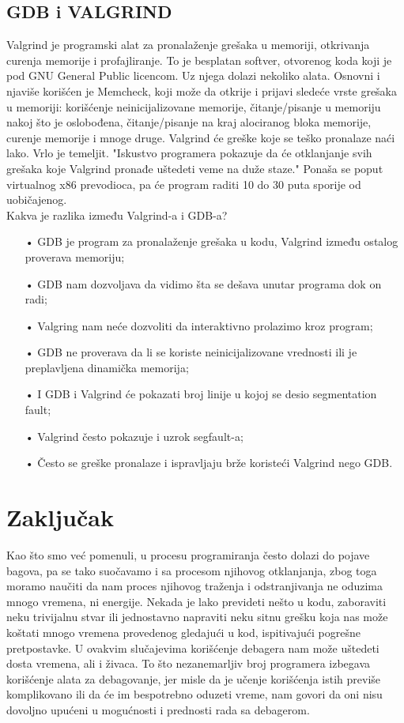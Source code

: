 \documentclass[a4paper]{article}
\begin{document}
\subsection{GDB i VALGRIND}
\label{subsec:valgrind}
Valgrind je programski alat za pronalaženje grešaka u memoriji, otkrivanja curenja memorije i 
profajliranje. To je besplatan softver, otvorenog koda koji je pod GNU General Public licencom. 
Uz njega dolazi nekoliko alata. Osnovni i njaviše korišćen je Memcheck, koji može da otkrije i  
prijavi sledeće vrste grešaka u memoriji: korišćenje neinicijalizovane memorije, čitanje/pisanje u 
memoriju nakoj što je oslobođena, čitanje/pisanje na kraj alociranog bloka memorije, 
curenje memorije i  mnoge druge. Valgrind će greške koje se teško pronalaze naći lako. Vrlo je 
temeljit. "Iskustvo programera pokazuje da će otklanjanje svih grešaka koje Valgrind pronađe 
uštedeti veme na duže staze." Ponaša se poput virtualnog x86 prevodioca, pa će program raditi 10 
do 30 puta sporije od uobičajenog. \\

Kakva je razlika između Valgrind-a i GDB-a?
\begin{enumerate}
\item[•]GDB je program za pronalaženje grešaka u kodu, Valgrind između ostalog proverava memoriju;
\item[•]GDB nam dozvoljava da vidimo šta se dešava unutar programa dok on radi;
\item[•]Valgring nam neće dozvoliti da interaktivno prolazimo kroz program;
\item[•]GDB ne proverava da li se koriste neinicijalizovane vrednosti ili je preplavljena dinamička memorija;
\item[•]I GDB i Valgrind će pokazati broj linije u kojoj se desio segmentation fault;
\item[•]Valgrind često pokazuje i uzrok segfault-a;
\item[•]Često se greške pronalaze i ispravljaju brže koristeći Valgrind nego GDB. \cite{hpc}
\end{enumerate}

\section{Zaključak}
\label{sec:zakljucak}

Kao što smo već pomenuli, u procesu programiranja često dolazi do pojave bagova, pa se tako suočavamo i sa procesom njihovog otklanjanja, zbog toga moramo naučiti da nam proces njihovog traženja i odstranjivanja ne oduzima mnogo vremena, ni energije. Nekada je lako prevideti nešto u kodu, zaboraviti neku trivijalnu stvar ili jednostavno napraviti neku sitnu grešku koja nas može koštati mnogo vremena provedenog gledajući u kod, ispitivajući pogrešne pretpostavke. U ovakvim slučajevima korišćenje debagera nam može uštedeti dosta vremena, ali i živaca. To što nezanemarljiv broj programera izbegava korišćenje alata za debagovanje, jer misle da je učenje korišćenja istih previše komplikovano ili da će im bespotrebno oduzeti vreme, nam govori da oni nisu dovoljno upućeni u mogućnosti i prednosti rada sa debagerom.
\end{document}
